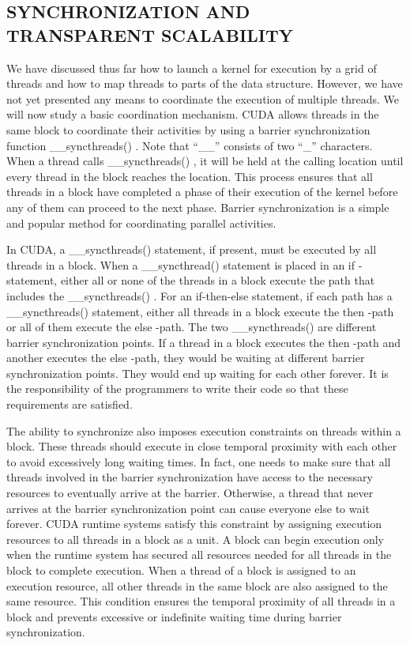 \documentclass[11pt]{ctexart}
\begin{document}
\subsection{SYNCHRONIZATION AND TRANSPARENT SCALABILITY}

We have discussed thus far how to launch a kernel for execution by a grid of threads
and how to map threads to parts of the data structure. However, we have not yet presented any means to coordinate the execution of multiple threads. We will now study a basic coordination mechanism. CUDA allows threads in the same block to coordinate their activities by using a barrier synchronization function \_\_syncthreads() . Note that “\_\_” consists of two “\_” characters. When a thread calls \_\_syncthreads() , it will be held at the calling location until every thread in the block reaches the location. This process ensures that all threads in a block have completed a phase of their execution of the kernel before any of them can proceed to the next phase. Barrier synchronization is a simple and popular method for coordinating parallel activities.

In CUDA, a \_\_syncthreads() statement, if present, must be executed by all threads
in a block. When a \_\_syncthread() statement is placed in an if -statement, either all or none of the threads in a block execute the path that includes the \_\_syncthreads() . For an if-then-else statement, if each path has a \_\_syncthreads() statement, either all threads in a block execute the then -path or all of them execute the else -path. The two \_\_syncthreads() are different barrier synchronization points. If a thread in a block executes the then -path and another executes the else -path, they would be waiting at different barrier synchronization points. They would end up waiting for each other forever. It is the responsibility of the programmers to write their code so that these requirements are satisfied.

The ability to synchronize also imposes execution constraints on threads within a
block. These threads should execute in close temporal proximity with each other to
avoid excessively long waiting times. In fact, one needs to make sure that all threads
involved in the barrier synchronization have access to the necessary resources to eventually arrive at the barrier. Otherwise, a thread that never arrives at the barrier synchronization point can cause everyone else to wait forever. CUDA runtime systems satisfy this constraint by assigning execution resources to all threads in a block as a unit. A block can begin execution only when the runtime system has secured all resources needed for all threads in the block to complete execution. When a thread of a block is assigned to an execution resource, all other threads in the same block are also assigned to the same resource. This condition ensures the temporal proximity of all threads in a block and prevents excessive or indefinite waiting time during barrier synchronization.
\end{document}
